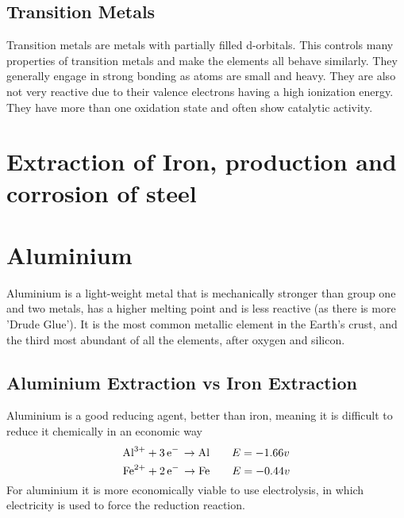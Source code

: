 \documentclass[a4paper, 12pt]{article}
\begin{document}
		\subsection{Transition Metals}
			Transition metals are metals with partially filled d-orbitals. This controls many properties of transition metals and make the elements all behave similarly. They generally engage in strong bonding as atoms are small and heavy. They are also not very reactive due to their valence electrons having a high ionization energy. They have more than one oxidation state and often show catalytic activity.
				
	\newpage				
	
	\section{Extraction of Iron, production and corrosion of steel}
	
	
	\newpage
	
	\section{Aluminium}
		Aluminium is a light-weight metal that is mechanically stronger than group one and two metals, has a higher melting point and is less reactive (as there is more 'Drude Glue'). It is the most common metallic element in the Earth's crust, and the third most abundant of all the elements, after oxygen and silicon.
		
		\subsection{Aluminium Extraction vs Iron Extraction}
			Aluminium is a good reducing agent, better than iron, meaning it is difficult to reduce it chemically in an economic way
			\[ \ce{Al^3+ + 3e- \rightarrow Al} \qquad E=-1.66v \]
			\[ \ce{Fe^2+ + 2e- \rightarrow Fe} \qquad E=-0.44v \]
			For aluminium it is more economically viable to use electrolysis, in which electricity is used to force the reduction reaction. 
			
\end{document}
